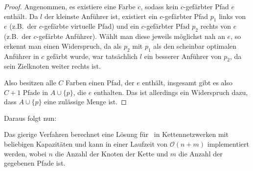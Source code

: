 \begin{proof}
    Angenommen, es existiere eine Farbe $c$, sodass kein $c$-gefärbter Pfad $e$ enthält.
    Da $l$ der kleinste Anführer ist, existiert ein $c$-gefärbter Pfad $p_1$ links von $e$ (z.B.\ der $c$-gefärbte virtuelle Pfad) und ein $c$-gefärbter Pfad $p_2$
    rechts von $e$ (z.B.\ der $c$-gefärbte Anführer).
    Wählt man diese jeweils möglichst nah an $e$, so erkennt man einen Widerspruch, da als $p_2$ mit $p_1$ als den
    scheinbar optimalen Anführer in $c$ gefärbt wurde, war tatsächlich $l$ ein besserer Anführer von $p_2$, da sein Zielknoten weiter rechts ist.

    Also besitzen alle $C$ Farben einen Pfad, der $e$ enthält, insgesamt gibt es also $C+1$ Pfade in $A \cup \{p\}$, die
    $e$ enthalten.
    Das ist allerdings ein Widerspruch dazu, dass $A \cup \{p\}$ eine zulässige Menge ist.
\end{proof}

Daraus folgt nun:

\begin{theorem}\label{theorem:greedyAlgorithm}
    Das gierige Verfahren berechnet eine Lösung für \CallControl\ in Kettennetzwerken mit beliebigen Kapazitäten und kann in einer Laufzeit von
    $\mathcal O(n+m)$ implementiert werden, wobei $n$ die Anzahl der Knoten der Kette und $m$ die Anzahl der gegebenen Pfade ist.
\end{theorem}
